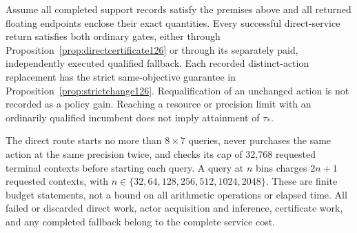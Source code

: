 \begin{proposition}
\label{prop:directservice126}
Assume all completed support records satisfy the premises above and
all returned floating endpoints enclose their exact quantities.
Every successful direct-service return satisfies both ordinary
gates, either through Proposition~\ref{prop:directcertificate126}
or through its separately paid, independently executed qualified
fallback.  Each recorded distinct-action replacement has the strict
same-objective guarantee in Proposition~\ref{prop:strictchange126}.
Requalification of an unchanged action is not recorded as a policy
gain.  Reaching a resource or precision limit with an ordinarily
qualified incumbent does not imply attainment of $\tau_*$.

The direct route starts no more than $8\times7$ queries, never
purchases the same action at the same precision twice, and checks its cap
of 32,768 requested terminal contexts before starting each query.
A query at $n$ bins charges $2n+1$ requested contexts, with
$n\in\{32,64,128,256,512,1024,2048\}$.  These are finite budget
statements, not a bound on all arithmetic operations or elapsed time.
All failed or discarded direct work, actor acquisition and inference,
certificate work, and any completed fallback belong to the complete
service cost.
\end{proposition}

